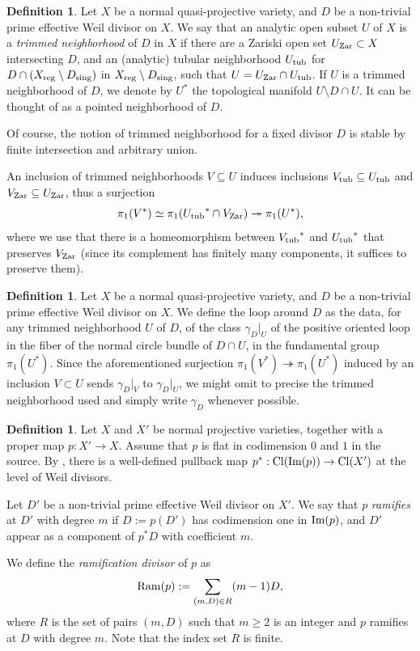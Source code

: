 \documentclass{amsart}
\theoremstyle{definition}
\newtheorem{definition}[theorem]{Definition}
\theoremstyle{remark}
\numberwithin{equation}{section}
\begin{document}
\begin{definition}
 Let $X$ be a normal quasi-projective variety, and $D$ be a non-trivial prime effective Weil divisor on $X$. 
    We say that an analytic open subset $U$ of $X$ is a \emph{trimmed neighborhood} of $D$ in $X$ if there are a Zariski open set $U_{\rm Zar}\subset X$ intersecting $D$, and an (analytic) tubular neighborhood $U_{\rm tub}$ for $D\cap (X_{\rm reg}\setminus D_{\rm sing})$ in $X_{\rm reg}\setminus D_{\rm sing}$, such that $U=U_{\rm Zar}\cap U_{\rm tub}$. If $U$ is a trimmed neighborhood of $D$, we denote by $U^*$ the topological manifold $U\setminus D\cap U$. It can be thought of as a pointed neighborhood of $D$.
    
    Of course, the notion of trimmed neighborhood for a fixed divisor $D$ is stable by finite intersection and arbitrary union.

    An inclusion of trimmed neighborhoods $V\subseteq U$ induces inclusions $V_{\rm tub}\subseteq U_{\rm tub}$ and $V_{\rm Zar}\subseteq U_{\rm Zar}$, thus a surjection
    $$\pi_1(V^*)\simeq \pi_1({U_{\rm tub}}^*\cap V_{\rm Zar})\twoheadrightarrow \pi_1(U^*),$$
     where we use that there is a homeomorphism between ${V_{\rm tub}}^*$ and ${U_{\rm tub}}^*$ that preserves $V_{\rm Zar}$ (since its complement has finitely many components, it suffices to preserve them).
    
\end{definition}

\begin{definition}
Let $X$ be a normal quasi-projective variety, and $D$ be a non-trivial prime effective Weil divisor on $X$.
We define the loop around $D$ as the data, for any trimmed neighborhood $U$ of $D$, of the class $\gamma_{D}|_U$ of the positive oriented loop in the fiber of the normal circle bundle of $D\cap U$, in the fundamental group $\pi_1(U^*)$. Since the aforementioned surjection $\pi_1(V^*)\twoheadrightarrow\pi_1(U^*)$ induced by an inclusion $V\subset U$ sends $\gamma_D|_{V}$ to $\gamma_D|_{U}$, we might omit to precise the trimmed neighborhood used and simply write $\gamma_D$ whenever possible.
\end{definition}


\begin{definition}\label{def-canpb}
 Let $X$ and $X'$ be normal projective varieties, together with a proper map $p:X'\to X$. Assume that $p$ is flat in codimension $0$ and $1$ in the source. By \cite[~21.10.1]{EGA-IV}, there is a well-defined pullback map $p^*:{\rm Cl}({\rm Im}(p))\to {\rm Cl}(X')$ at the level of Weil divisors.
    
    Let $D'$ be a non-trivial prime effective Weil divisor on $X'$. We say that $p$ {\em ramifies} at $D'$ with degree $m$ if $D:=p(D')$ has codimension one in ${\rm Im}(p)$, and $D'$ appear as a component of $p^*D$ with coefficient $m$.
    
    We define the {\em ramification divisor} of $p$ as 
    $${\rm Ram}(p):=\sum_{(m,D)\in R} (m-1)D,$$
    where $R$ is the set of pairs $(m,D)$ such that $m\ge 2$ is an integer and $p$ ramifies at $D$ with degree $m$. Note that the index set $R$ is finite.
\end{definition}
\end{document}
